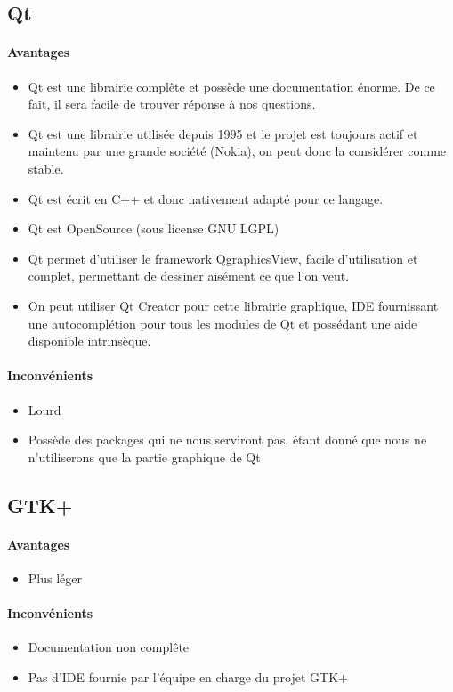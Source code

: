\documentclass[a4paper]{article}
\begin{document}
\subsection{Qt}
\paragraph{Avantages}
\begin{itemize}
\item Qt est une librairie complête et possède une documentation énorme. De ce fait, il sera facile de trouver réponse à nos questions.
\item Qt est une librairie utilisée depuis 1995 et le projet est toujours actif et maintenu par une grande société (Nokia), on peut donc la considérer comme stable.
\item Qt est écrit en C++ et donc nativement adapté pour ce langage.
\item Qt est OpenSource (sous license GNU LGPL)
\item Qt permet d'utiliser le framework QgraphicsView, facile d'utilisation et complet, permettant de dessiner aisément ce que l'on veut.
\item On peut utiliser Qt Creator pour cette librairie graphique, IDE fournissant une autocomplétion pour tous les modules de Qt et possédant une aide disponible intrinsèque.
\end{itemize}
\paragraph{Inconvénients}
\begin{itemize}
\item Lourd
\item Possède des packages qui ne nous serviront pas, étant donné que nous ne n'utiliserons que la partie graphique de Qt
\end{itemize}
\subsection{GTK+}
\paragraph{Avantages}
\begin{itemize}
\item Plus léger
\end{itemize}
\paragraph{Inconvénients}
\begin{itemize}
\item Documentation non complête
\item Pas d'IDE fournie par l'équipe en charge du projet GTK+
\end{itemize}


\printindex
\listoffigures
\end{document}
